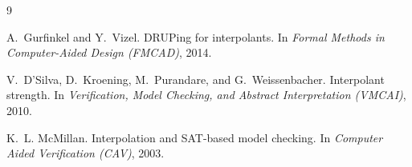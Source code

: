 \documentclass[11pt]{article}
\begin{document}
\begin{thebibliography}{9}

A.~Gurfinkel and Y.~Vizel.
\newblock DRUPing for interpolants.
\newblock In \emph{Formal Methods in Computer-Aided Design (FMCAD)}, 2014.

V.~D'Silva, D.~Kroening, M.~Purandare, and G.~Weissenbacher.
\newblock Interpolant strength.
\newblock In \emph{Verification, Model Checking, and Abstract Interpretation
  (VMCAI)}, 2010.

K.~L. McMillan.
\newblock Interpolation and SAT-based model checking.
\newblock In \emph{Computer Aided Verification (CAV)}, 2003.

\end{thebibliography}
\end{document}
